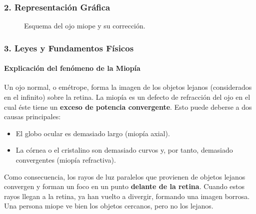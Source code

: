 \subsubsection*{2. Representación Gráfica}
\begin{figure}[H]
    \centering
    \hfill
    \caption{Esquema del ojo miope y su corrección.}
\end{figure}

\subsubsection*{3. Leyes y Fundamentos Físicos}
\paragraph{Explicación del fenómeno de la Miopía}
Un ojo normal, o emétrope, forma la imagen de los objetos lejanos (considerados en el infinito) sobre la retina. La miopía es un defecto de refracción del ojo en el cual éste tiene un \textbf{exceso de potencia convergente}. Esto puede deberse a dos causas principales:
\begin{itemize}
    \item El globo ocular es demasiado largo (miopía axial).
    \item La córnea o el cristalino son demasiado curvos y, por tanto, demasiado convergentes (miopía refractiva).
\end{itemize}
Como consecuencia, los rayos de luz paralelos que provienen de objetos lejanos convergen y forman un foco en un punto \textbf{delante de la retina}. Cuando estos rayos llegan a la retina, ya han vuelto a divergir, formando una imagen borrosa. Una persona miope ve bien los objetos cercanos, pero no los lejanos.


